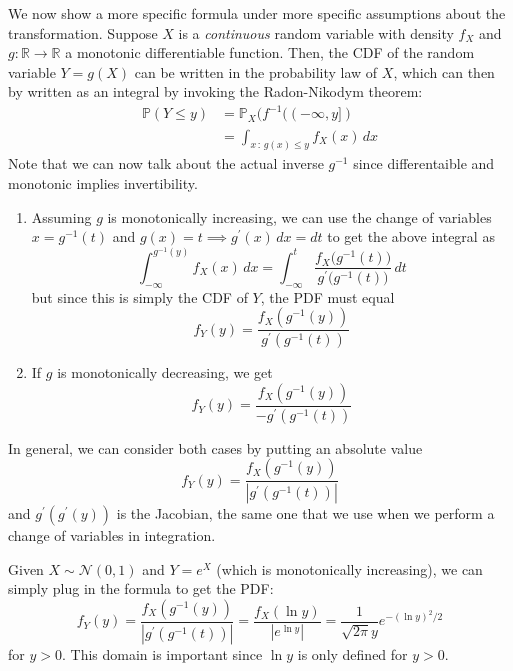     We now show a more specific formula under more specific assumptions about the transformation. Suppose $X$ is a \textit{continuous} random variable with density $f_X$ and $g: \mathbb{R} \rightarrow \mathbb{R}$ a monotonic differentiable function. Then, the CDF of the random variable $Y = g(X)$ can be written in the probability law of $X$, which can then by written as an integral by invoking the Radon-Nikodym theorem: 
    \begin{align*}
      \mathbb{P}(Y \leq y) & = \mathbb{P}_X (f^{-1} ((-\infty, y]) \\
      & = \int_{x \,:\, g(x) \leq y} f_X (x) \,dx
    \end{align*}
    Note that we can now talk about the actual inverse $g^{-1}$ since differentaible and monotonic implies invertibility. 
    \begin{enumerate}
      \item Assuming $g$ is monotonically increasing, we can use the change of variables $x = g^{-1} (t)$ and $g(x) = t \implies g^\prime (x) \,dx = dt$ to get the above integral as 
      \begin{equation}
        \int_{-\infty}^{g^{-1} (y)} f_X (x) \,dx = \int_{-\infty}^t \frac{f_X \big( g^{-1} (t) \big)}{g^\prime \big( g^{-1} (t)\big)} \,dt 
      \end{equation}
      but since this is simply the CDF of $Y$, the PDF must equal 
      \begin{equation}
        f_Y (y) = \frac{f_X (g^{-1} (y) )}{g^\prime (g^{-1} (t))}
      \end{equation}
      \item If $g$ is monotonically decreasing, we get 
      \begin{equation}
        f_Y (y) = \frac{f_X (g^{-1} (y) )}{- g^\prime (g^{-1} (t))}
      \end{equation}
    \end{enumerate}
    In general, we can consider both cases by putting an absolute value 
    \begin{equation}
      f_Y (y) = \frac{f_X (g^{-1} (y) )}{|g^\prime (g^{-1} (t))|}
    \end{equation}
    and $g^\prime (g^\prime (y))$ is the Jacobian, the same one that we use when we perform a change of variables in integration. 

    \begin{example}
      Given $X \sim \mathcal{N}(0, 1)$ and $Y = e^X$ (which is monotonically increasing), we can simply plug in the formula to get the PDF: 
      \begin{equation}
        f_Y (y) = \frac{f_X (g^{-1} (y) )}{|g^\prime (g^{-1} (t))|} = \frac{f_X (\ln{y}) }{ | e^{\ln{y}} |} = \frac{1}{\sqrt{2 \pi} y} e^{-(\ln{y})^2 / 2}
      \end{equation}
      for $y > 0$. This domain is important since $\ln{y}$ is only defined for $y > 0$. 
    \end{example}

